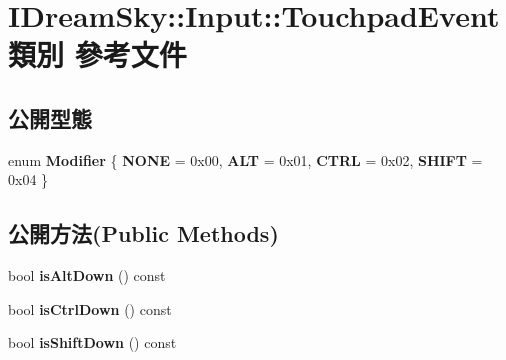 \hypertarget{class_i_dream_sky_1_1_input_1_1_touchpad_event}{}\section{I\+Dream\+Sky\+:\+:Input\+:\+:Touchpad\+Event 類別 參考文件}
\label{class_i_dream_sky_1_1_input_1_1_touchpad_event}
\subsection*{公開型態}
\begin{DoxyCompactItemize}
\item 
enum {\bfseries Modifier} \{ {\bfseries N\+O\+NE} = 0x00, 
{\bfseries A\+LT} = 0x01, 
{\bfseries C\+T\+RL} = 0x02, 
{\bfseries S\+H\+I\+FT} = 0x04
 \}\hypertarget{class_i_dream_sky_1_1_input_1_1_touchpad_event_ae4554134626892a7f41de26ff408d501}{}\label{class_i_dream_sky_1_1_input_1_1_touchpad_event_ae4554134626892a7f41de26ff408d501}

\end{DoxyCompactItemize}
\subsection*{公開方法(Public Methods)}
\begin{DoxyCompactItemize}
\item 
bool {\bfseries is\+Alt\+Down} () const \hypertarget{class_i_dream_sky_1_1_input_1_1_touchpad_event_ae4900b73a4e4ea6647c6362006028875}{}\label{class_i_dream_sky_1_1_input_1_1_touchpad_event_ae4900b73a4e4ea6647c6362006028875}

\item 
bool {\bfseries is\+Ctrl\+Down} () const \hypertarget{class_i_dream_sky_1_1_input_1_1_touchpad_event_ab5ab3f8ead094042080ab0830c68618e}{}\label{class_i_dream_sky_1_1_input_1_1_touchpad_event_ab5ab3f8ead094042080ab0830c68618e}

\item 
bool {\bfseries is\+Shift\+Down} () const \hypertarget{class_i_dream_sky_1_1_input_1_1_touchpad_event_a4857c7311ad1dc9794d8a35f1fd9dd4f}{}\label{class_i_dream_sky_1_1_input_1_1_touchpad_event_a4857c7311ad1dc9794d8a35f1fd9dd4f}

\end{DoxyCompactItemize}
